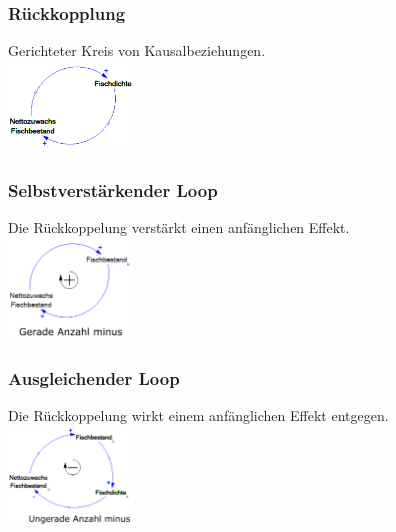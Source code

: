 \begin{multicols}{3}
	\subsubsection{Rückkopplung}
	Gerichteter Kreis von Kausalbeziehungen. \\
	\includegraphics[width=0.25\textwidth]{pictures/rueckkopplung} \\
	
	\subsubsection{Selbstverstärkender Loop}
	Die Rückkoppelung verstärkt einen anfänglichen Effekt. \\
	\includegraphics[width=0.25\textwidth]{pictures/selbstverstaerkender_loop}
	
	\subsubsection{Ausgleichender Loop}
	Die Rückkoppelung wirkt	einem anfänglichen Effekt entgegen.\\
	\includegraphics[width=0.25\textwidth]{pictures/ausgleichender_loop}
\end{multicols}	

